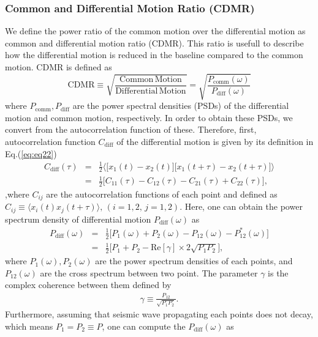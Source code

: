 \subsubsection{Common and Differential Motion Ratio (CDMR)}\label{sec:sec313}
We define the power ratio of the common motion over the differential motion as common and differential motion ratio (CDMR). This ratio is usefull to describe how the differential motion is reduced in the baseline compared to the common motion. CDMR is defined as
\begin{equation}
  \mathrm{CDMR} \equiv \sqrt{\frac{\mathrm{Common\,Motion}}{\mathrm{Differential\,Motion}}} = \sqrt{\frac{P_{\mathrm{comm}}(\omega)}{P_{\mathrm{diff}}(\omega)}} \label{eq:eq23}
\end{equation}
where $P_{\mathrm{comm}},P_{\mathrm{diff}}$ are the power spectral densities (PSDs) of the differential motion and common motion, respectively. In order to obtain these PSDs, we convert from the autocorrelation function of these. Therefore, first, autocorrelation function $C_{\mathrm{diff}}$ of the differential motion is given by its definition in Eq.(\ref{eq:eq22})
\begin{eqnarray}
  C_{\mathrm{diff}}(\tau) &=& \frac{1}{2}
  \biggl\langle
  \biggl[ x_{1}(t)-x_{2}(t) \biggr] \biggl[ x_{1}(t+\tau)-x_{2}(t+\tau) \biggr]
  \biggr\rangle \\
  &=& \frac{1}{2}\biggl[ C_{11}(\tau) - C_{12}(\tau) - C_{21}(\tau) + C_{22}(\tau) \biggr], 
\end{eqnarray}
,where $C_{ij}$ are the autocorrelation functions of each point and defined as $ C_{ij} \equiv \langle x_{i}(t)x_{j}(t+\tau)\rangle,\, (i=1,2,\,j=1,2)$. Here, one can obtain the power spectrum density of differential motion $P_{\mathrm{diff}}(\omega)$ as 
\begin{eqnarray}
  P_{\mathrm{diff}}(\omega) &=& \frac{1}{2}\biggl[ P_{1}(\omega) + P_{2}(\omega) - P_{12}(\omega) - P_{12}^*(\omega) \biggr]\\
  &=& \frac{1}{2} \biggl[ P_{1}+P_{2} - \mathrm{Re}\left[\gamma \right]\times2\sqrt{P_{1}P_{2}} \biggr], \label{eq:eq31}
\end{eqnarray}
where $P_{1}(\omega),P_{2}(\omega)$ are the power spectrum densities of each points, and $P_{12}(\omega)$ are the cross spectrum between two point. The parameter $\gamma$ is the complex coherence between them defined by
\begin{eqnarray}
  \gamma \equiv \frac{P_{12}}{\sqrt{P_{1}P_{2}}}.
\end{eqnarray}
Furthermore, assuming that seismic wave propagating each points does not decay, which means $P_{1}=P_{2} \equiv P$, one can compute the $P_{\mathrm{diff}}(\omega)$ as 
